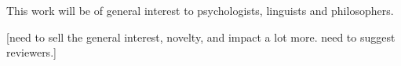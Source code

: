 \documentclass[10pt,stdletter,dateno,sigleft]{newlfm} %
\begin{document}
\begin{newlfm}
This work will be of general interest to psychologists, linguists and philosophers.

[need to sell the general interest, novelty, and impact a lot more. need to suggest reviewers.]


\end{newlfm}
\end{document}

